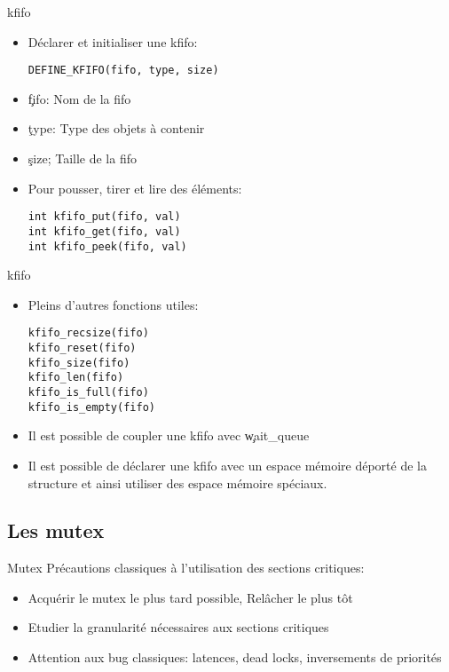 \begin{frame}[fragile=singleslide]{kfifo}
  \begin{itemize}
  \item Déclarer et initialiser une kfifo: 
    \begin{lstlisting} 
DEFINE_KFIFO(fifo, type, size)
    \end{lstlisting} 
  \item \c{fifo}: Nom de la fifo
  \item \c{type}: Type des objets à contenir
  \item \c{size}; Taille de la fifo
  \item Pour pousser, tirer et lire des éléments:
    \begin{lstlisting} 
int kfifo_put(fifo, val) 
int kfifo_get(fifo, val)
int kfifo_peek(fifo, val)
    \end{lstlisting} 
  \end{itemize}
\end{frame}

\begin{frame}[fragile=singleslide]{kfifo}
  \begin{itemize}
  \item Pleins d'autres fonctions utiles:
    \begin{lstlisting}
kfifo_recsize(fifo)
kfifo_reset(fifo) 
kfifo_size(fifo)  
kfifo_len(fifo)
kfifo_is_full(fifo)
kfifo_is_empty(fifo)
    \end{lstlisting} 
  \item Il est possible de coupler une kfifo avec \c{wait_queue}
  \item Il est  possible de déclarer une kfifo  avec un espace mémoire
    déporté  de la  structure  et ainsi  utiliser  des espace  mémoire
    spéciaux.
  \end{itemize} 
\end{frame} 

\subsection{Les mutex}

\begin{frame}{Mutex}
  Précautions classiques à l'utilisation des sections critiques:
  \begin{itemize}
  \item Acquérir le mutex le plus tard possible, Relâcher le plus tôt
  \item Etudier la granularité nécessaires aux sections critiques
  \item   Attention  aux   bug  classiques:   latences,   dead  locks,
    inversements de priorités
  \end{itemize} 
\end{frame}


